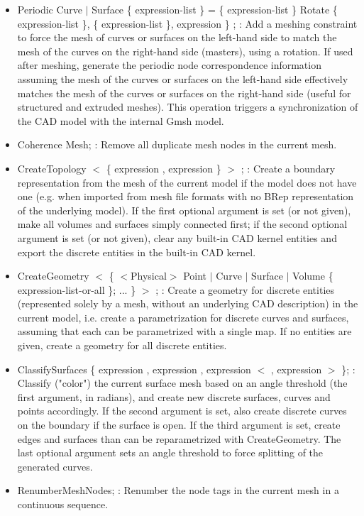 \documentclass[dvipdfmx, 9pt, a4paper]{article}
\numberwithin{equation}{section}
\begin{document}
\begin{itemize}
\item Periodic Curve $|$ Surface \{ expression-list \} = \{ expression-list \} Rotate \{ expression-list \}, \{ expression-list \}, expression \} ; : Add a meshing constraint to force the mesh of curves or surfaces on the left-hand side to match the mesh of the curves on the right-hand side (masters), using a rotation. If used after meshing, generate the periodic node correspondence information assuming the mesh of the curves or surfaces on the left-hand side effectively matches the mesh of the curves or surfaces on the right-hand side (useful for structured and extruded meshes). This operation triggers a synchronization of the CAD model with the internal Gmsh model.
\item Coherence Mesh; : Remove all duplicate mesh nodes in the current mesh.
\item CreateTopology $<$ \{ expression , expression \} $>$ ; : Create a boundary representation from the mesh of the current model if the model does not have one (e.g. when imported from mesh file formats with no BRep representation of the underlying model). If the first optional argument is set (or not given), make all volumes and surfaces simply connected first; if the second optional argument is set (or not given), clear any built-in CAD kernel entities and export the discrete entities in the built-in CAD kernel.
\item CreateGeometry $<$ \{ $<$Physical$>$ Point $|$ Curve $|$ Surface $|$ Volume \{ expression-list-or-all \}; ... \} $>$ ; : Create a geometry for discrete entities (represented solely by a mesh, without an underlying CAD description) in the current model, i.e. create a parametrization for discrete curves and surfaces, assuming that each can be parametrized with a single map. If no entities are given, create a geometry for all discrete entities.
\item ClassifySurfaces \{ expression , expression , expression $<$ , expression $>$ \}; : Classify ("color") the current surface mesh based on an angle threshold (the first argument, in radians), and create new discrete surfaces, curves and points accordingly. If the second argument is set, also create discrete curves on the boundary if the surface is open. If the third argument is set, create edges and surfaces than can be reparametrized with CreateGeometry. The last optional argument sets an angle threshold to force splitting of the generated curves.
\item RenumberMeshNodes; : Renumber the node tags in the current mesh in a continuous sequence.

\end{itemize}
\end{document}
